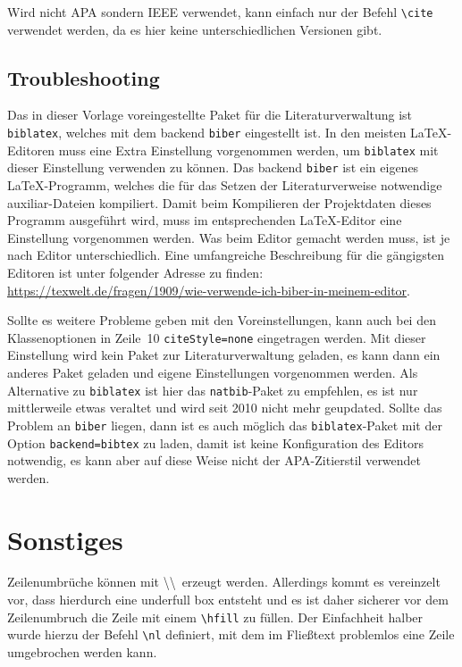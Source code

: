 Wird nicht APA sondern IEEE verwendet, kann einfach nur der Befehl \texttt{\textbackslash{}cite} verwendet werden, da es hier keine unterschiedlichen Versionen gibt.

\subsection*{Troubleshooting}

Das in dieser Vorlage voreingestellte Paket für die Literaturverwaltung ist \texttt{biblatex}, welches mit dem backend \texttt{biber} eingestellt ist.
In den meisten \LaTeX{}-Editoren muss eine Extra Einstellung vorgenommen werden, um \texttt{biblatex} mit dieser Einstellung verwenden zu können.
Das backend \texttt{biber} ist ein eigenes \LaTeX{}-Programm, welches die für das Setzen der Literaturverweise notwendige auxiliar-Dateien kompiliert.
Damit beim Kompilieren der Projektdaten dieses Programm ausgeführt wird, muss im entsprechenden \LaTeX{}-Editor eine Einstellung vorgenommen werden.
Was beim Editor gemacht werden muss, ist je nach Editor unterschiedlich.
Eine umfangreiche Beschreibung für die gängigsten Editoren ist unter folgender Adresse zu finden: \href{https://texwelt.de/fragen/1909/wie-verwende-ich-biber-in-meinem-editor}{https://texwelt.de/fragen/1909/wie-verwende-ich-biber-in-meinem-editor}.

Sollte es weitere Probleme geben mit den Voreinstellungen, kann auch bei den Klassenoptionen in Zeile~10 \texttt{citeStyle=none} eingetragen werden.
Mit dieser Einstellung wird kein Paket zur Literaturverwaltung geladen, es kann dann ein anderes Paket geladen und eigene Einstellungen vorgenommen werden.
Als Alternative zu \texttt{biblatex} ist hier das \texttt{natbib}-Paket zu empfehlen, es ist nur mittlerweile etwas veraltet und wird seit 2010 nicht mehr geupdated.
Sollte das Problem an \texttt{biber} liegen, dann ist es auch möglich das \texttt{biblatex}-Paket mit der Option \texttt{backend=bibtex} zu laden, damit ist keine Konfiguration des Editors notwendig, es kann aber auf diese Weise nicht der APA-Zitierstil verwendet werden.

\section{Sonstiges}

Zeilenumbrüche können mit \textbackslash\textbackslash\ erzeugt werden. 
Allerdings kommt es vereinzelt vor, dass hierdurch eine \glqq{}underfull box\grqq{} entsteht und es ist daher sicherer vor dem Zeilenumbruch die Zeile mit einem \texttt{\textbackslash{}hfill} zu \glqq{}füllen\grqq{}. 
Der Einfachheit halber wurde hierzu der Befehl \texttt{\textbackslash{}nl} definiert, mit dem im Fließtext problemlos eine Zeile umgebrochen werden kann.

